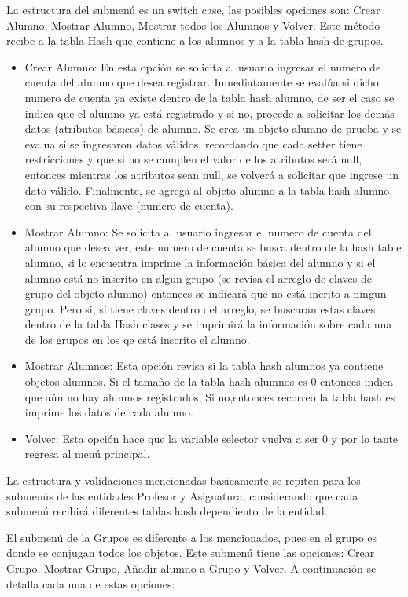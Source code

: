 \documentclass[12pt, letterpaper]{report}
\begin{document}
La estructura del submenú es un switch case, las posibles opciones son: Crear Alumno, Mostrar Alumno, Mostrar todos los Alumnos y Volver. Este método recibe a la tabla Hash que contiene a los alumnos y a la tabla hash de grupos. 

\begin{itemize}
  \item Crear Alumno: En esta opción se solicita al usuario ingresar el numero de cuenta del alumno que desea registrar. Inmediatamente se evalúa si dicho numero de cuenta ya existe dentro de la tabla hash alumno, de ser el caso se indica que el alumno ya está registrado y si no, procede a solicitar los demás datos (atributos básicos) de alumno. Se crea un objeto alumno de prueba y se evalua si se ingresaron datos válidos, recordando que cada setter tiene restricciones y que si no se cumplen el valor de los atributos será null, entonces mientras los atributos sean null, se volverá a solicitar que ingrese un dato válido. Finalmente, se agrega al objeto alumno a la tabla hash alumno, con su respectiva llave (numero de cuenta).
  \item Mostrar Alumno: Se solicita al usuario ingresar el numero de cuenta del alumno que desea ver, este numero de cuenta se busca dentro de la hash table alumno, si lo encuentra imprime la información básica del alumno y si el alumno está no inscrito en algun grupo (se revisa el arreglo de claves de grupo del objeto alumno) entonces se indicará que no está incrito a ningun grupo. Pero si, sí tiene claves dentro del arreglo, se buscaran estas claves dentro de la tabla Hash clases y se imprimirá la información sobre cada una de los grupos en los qe está inscrito el alumno. 
  \item Mostrar Alumnos: Esta opción revisa si la tabla hash alumnos ya contiene objetos alumnos. Si el tamaño de la tabla hash alumnos es 0 entonces indica que aún no hay alumnos registrados, Si no,entonces recorreo la tabla hash es imprime los datos de cada alumno. 
  \item Volver: Esta opción hace que la variable selector vuelva a ser 0 y por lo tante regresa al menú principal.
\end{itemize}

La estructura y validaciones mencionadas basicamente se repiten para los submenús de las entidades Profesor y Asignatura, considerando que cada submenú recibirá diferentes tablas hash dependiento de la entidad.

El submenú de la Grupos es diferente a los mencionados, pues en el grupo es donde se conjugan todos los objetos. Este submenú tiene las opciones: Crear Grupo, Mostrar Grupo, Añadir alumno a Grupo y Volver. A continuación se detalla cada una de estas opciones: 
\end{document}
